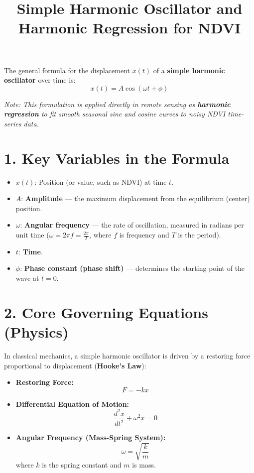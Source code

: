 \documentclass[11pt,a4paper]{article}
\title{Simple Harmonic Oscillator and Harmonic Regression for NDVI}
\author{}
\date{}
\begin{document}
\maketitle

The general formula for the displacement $x(t)$ of a \textbf{simple harmonic oscillator} over time is:
\begin{equation}
x(t) = A \cos(\omega t + \phi)
\end{equation}

\noindent \textit{Note: This formulation is applied directly in remote sensing as \textbf{harmonic regression} to fit smooth seasonal sine and cosine curves to noisy NDVI time-series data.}

\section*{1. Key Variables in the Formula}
\begin{itemize}[leftmargin=1.5em]
    \item $x(t)$: Position (or value, such as NDVI) at time $t$.
    \item $A$: \textbf{Amplitude} --- the maximum displacement from the equilibrium (center) position.
    \item $\omega$: \textbf{Angular frequency} --- the rate of oscillation, measured in radians per unit time ($\omega = 2\pi f = \frac{2\pi}{T}$, where $f$ is frequency and $T$ is the period).
    \item $t$: \textbf{Time}.
    \item $\phi$: \textbf{Phase constant (phase shift)} --- determines the starting point of the wave at $t = 0$.
\end{itemize}

\section*{2. Core Governing Equations (Physics)}
In classical mechanics, a simple harmonic oscillator is driven by a restoring force proportional to displacement (\textbf{Hooke's Law}):
\begin{itemize}[leftmargin=1.5em]
    \item \textbf{Restoring Force:}
    \begin{equation}
    F = -kx
    \end{equation}
    \item \textbf{Differential Equation of Motion:}
    \begin{equation}
    \frac{d^2x}{dt^2} + \omega^2 x = 0
    \end{equation}
    \item \textbf{Angular Frequency (Mass-Spring System):}
    \begin{equation}
    \omega = \sqrt{\frac{k}{m}}
    \end{equation}
    where $k$ is the spring constant and $m$ is mass.
\end{itemize}
\end{document}
